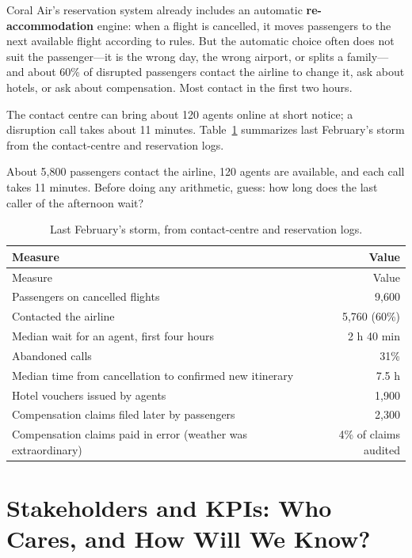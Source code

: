 Coral Air's reservation system already includes an automatic \textbf{re-accommodation} engine: when a flight is cancelled, it moves passengers to the next available flight according to rules. But the automatic choice often does not suit the passenger---it is the wrong day, the wrong airport, or splits a family---and about 60\% of disrupted passengers contact the airline to change it, ask about hotels, or ask about compensation. Most contact in the first two hours.

The contact centre can bring about 120 agents online at short notice; a disruption call takes about 11 minutes. Table~\ref{tab:air-today} summarizes last February's storm from the contact-centre and reservation logs.

\begin{thinkabout}
About 5{,}800 passengers contact the airline, 120 agents are available, and each call takes 11 minutes. Before doing any arithmetic, guess: how long does the last caller of the afternoon wait?
\end{thinkabout}

\begingroup
\small
\begin{longtable}{@{}lr@{}}
\caption{Last February's storm, from contact-centre and reservation logs.}\label{tab:air-today}\\
\toprule
\rowcolor{coHead} Measure & Value \\
\midrule
\endfirsthead
\toprule
\rowcolor{coHead} Measure & Value \\
\midrule
\endhead
Passengers on cancelled flights & 9{,}600 \\
Contacted the airline & 5{,}760 (60\%) \\
Median wait for an agent, first four hours & 2 h 40 min \\
Abandoned calls & 31\% \\
Median time from cancellation to confirmed new itinerary & 7.5 h \\
Hotel vouchers issued by agents & 1{,}900 \\
Compensation claims filed later by passengers & 2{,}300 \\
Compensation claims paid in error (weather was extraordinary) & 4\% of claims audited \\
\bottomrule
\end{longtable}
\endgroup

\section{Stakeholders and KPIs: Who Cares, and How Will We Know?}
\label{sec:air-kpis}


